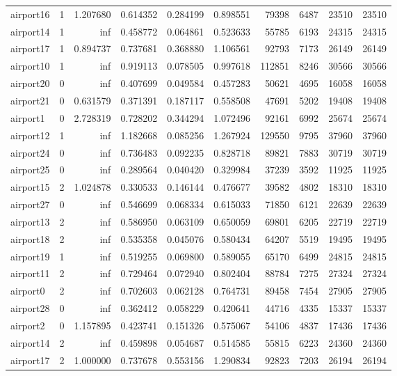 \begin{longtable}{|l|r|r|r|r|r|r|r|r|r|}
airport16 & 1 & 1.207680 & 0.614352 & 0.284199 & 0.898551 & 79398 & 6487 & 23510 & 23510 \\
airport14 & 1 & inf & 0.458772 & 0.064861 & 0.523633 & 55785 & 6193 & 24315 & 24315 \\
airport17 & 1 & 0.894737 & 0.737681 & 0.368880 & 1.106561 & 92793 & 7173 & 26149 & 26149 \\
airport10 & 1 & inf & 0.919113 & 0.078505 & 0.997618 & 112851 & 8246 & 30566 & 30566 \\
airport20 & 0 & inf & 0.407699 & 0.049584 & 0.457283 & 50621 & 4695 & 16058 & 16058 \\
airport21 & 0 & 0.631579 & 0.371391 & 0.187117 & 0.558508 & 47691 & 5202 & 19408 & 19408 \\
airport1 & 0 & 2.728319 & 0.728202 & 0.344294 & 1.072496 & 92161 & 6992 & 25674 & 25674 \\
airport12 & 1 & inf & 1.182668 & 0.085256 & 1.267924 & 129550 & 9795 & 37960 & 37960 \\
airport24 & 0 & inf & 0.736483 & 0.092235 & 0.828718 & 89821 & 7883 & 30719 & 30719 \\
airport25 & 0 & inf & 0.289564 & 0.040420 & 0.329984 & 37239 & 3592 & 11925 & 11925 \\
airport15 & 2 & 1.024878 & 0.330533 & 0.146144 & 0.476677 & 39582 & 4802 & 18310 & 18310 \\
airport27 & 0 & inf & 0.546699 & 0.068334 & 0.615033 & 71850 & 6121 & 22639 & 22639 \\
airport13 & 2 & inf & 0.586950 & 0.063109 & 0.650059 & 69801 & 6205 & 22719 & 22719 \\
airport18 & 2 & inf & 0.535358 & 0.045076 & 0.580434 & 64207 & 5519 & 19495 & 19495 \\
airport19 & 1 & inf & 0.519255 & 0.069800 & 0.589055 & 65170 & 6499 & 24815 & 24815 \\
airport11 & 2 & inf & 0.729464 & 0.072940 & 0.802404 & 88784 & 7275 & 27324 & 27324 \\
airport0 & 2 & inf & 0.702603 & 0.062128 & 0.764731 & 89458 & 7454 & 27905 & 27905 \\
airport28 & 0 & inf & 0.362412 & 0.058229 & 0.420641 & 44716 & 4335 & 15337 & 15337 \\
airport2 & 0 & 1.157895 & 0.423741 & 0.151326 & 0.575067 & 54106 & 4837 & 17436 & 17436 \\
airport14 & 2 & inf & 0.459898 & 0.054687 & 0.514585 & 55815 & 6223 & 24360 & 24360 \\
airport17 & 2 & 1.000000 & 0.737678 & 0.553156 & 1.290834 & 92823 & 7203 & 26194 & 26194 \\

\end{longtable}
